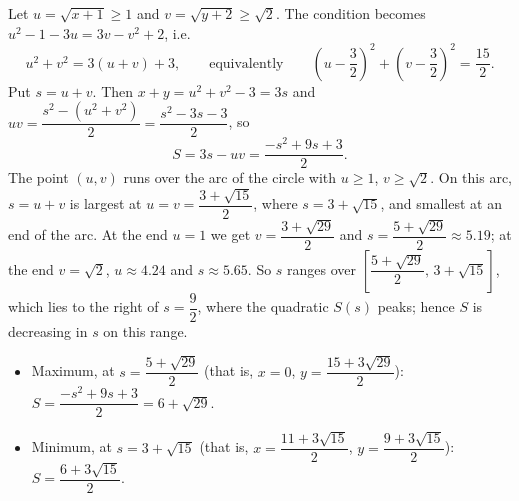 Let $u=\sqrt{x+1}\ge1$ and $v=\sqrt{y+2}\ge\sqrt2$. The condition becomes $u^2-1-3u=3v-v^2+2$, i.e.
\[
u^2+v^2=3(u+v)+3,\qquad\text{equivalently}\qquad\left(u-\dfrac{3}{2}\right)^2+\left(v-\dfrac{3}{2}\right)^2=\dfrac{15}{2}.
\]
Put $s=u+v$. Then $x+y=u^2+v^2-3=3s$ and $uv=\dfrac{s^2-(u^2+v^2)}{2}=\dfrac{s^2-3s-3}{2}$, so
\[
S=3s-uv=\dfrac{-s^2+9s+3}{2}.
\]
The point $(u,v)$ runs over the arc of the circle with $u\ge1$, $v\ge\sqrt2$. On this arc, $s=u+v$ is largest at $u=v=\dfrac{3+\sqrt{15}}{2}$, where $s=3+\sqrt{15}$, and smallest at an end of the arc. At the end $u=1$ we get $v=\dfrac{3+\sqrt{29}}{2}$ and $s=\dfrac{5+\sqrt{29}}{2}\approx5.19$; at the end $v=\sqrt2$, $u\approx4.24$ and $s\approx5.65$. So $s$ ranges over $\left[\dfrac{5+\sqrt{29}}{2},\,3+\sqrt{15}\right]$, which lies to the right of $s=\dfrac{9}{2}$, where the quadratic $S(s)$ peaks; hence $S$ is decreasing in $s$ on this range.
\begin{itemize}
\item Maximum, at $s=\dfrac{5+\sqrt{29}}{2}$ (that is, $x=0$, $y=\dfrac{15+3\sqrt{29}}{2}$): $S=\dfrac{-s^2+9s+3}{2}=\boxed{6+\sqrt{29}}$.
\item Minimum, at $s=3+\sqrt{15}$ (that is, $x=\dfrac{11+3\sqrt{15}}{2}$, $y=\dfrac{9+3\sqrt{15}}{2}$): $S=\boxed{\dfrac{6+3\sqrt{15}}{2}}$.
\end{itemize}
